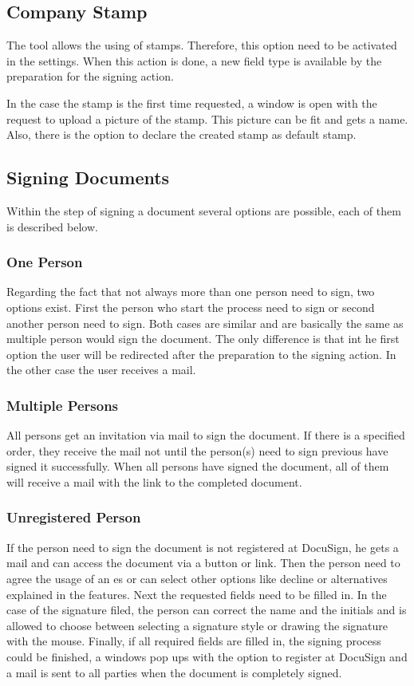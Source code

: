 \subsection{Company Stamp}
The tool allows the using of stamps. Therefore, this option need to be activated in the settings. When this action is done, a new field type is available by the preparation for the signing action.

In the case the stamp is the first time requested, a window is open with the request to upload a picture of the stamp. This picture can be fit and gets a name. Also, there is the option to declare the created stamp as default stamp. 

\subsection{Signing Documents}
Within the step of signing a document several options are possible, each of them is described below.

\subsubsection{One Person}
Regarding the fact that not always more than one person need to sign, two options exist. First the person who start the process need to sign or second another person need to sign. Both cases are similar and are basically the same as multiple person would sign the document. The only difference is that int he first option the user will be redirected after the preparation to the signing action. In the other case the user receives a mail. 

\subsubsection{Multiple Persons}
All persons get an invitation via mail to sign the document. If there is a specified order, they receive the mail not until the person(s) need to sign previous have signed it successfully. When all persons have signed the document, all of them will receive a mail with the link to the completed document.

\subsubsection{Unregistered Person}
If the person need to sign the document is not registered at DocuSign, he gets a mail and can access the document via a button or link. Then the person need to agree the usage of an \gls{es} or can select other options like decline or alternatives explained in the features. Next the requested fields need to be filled in. In the case of the signature filed, the person can correct the name and the initials and is allowed to choose between selecting a signature style or drawing the signature with the mouse. Finally, if all required fields are filled in, the signing process could be finished, a windows pop ups with the option to register at DocuSign and a mail is sent to all parties when the document is completely signed. 

